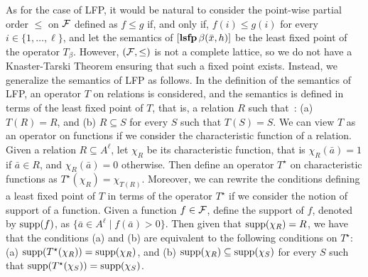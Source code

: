 As for the case of LFP, it would be natural to consider the point-wise partial order $\leq$ on $\mathcal{F}$ defined as $f \leq g$ if, and only if, $f(i) \leq g(i)$ for every $i \in \{1, \ldots, \ell\}$, and let the semantics of $[{\bf lsfp} \, \beta(\bar{x},h)]$ be the least fixed point of the operator $T_\beta$. However, $(\mathcal{F}, \leq)$ is not a complete lattice, so we do not have a Knaster-Tarski Theorem ensuring that such a fixed point exists. Instead, we generalize the semantics of LFP as follows. In the definition of the semantics of LFP, an operator $T$ on relations is considered, and the semantics is defined in terms of the least fixed point of $T$, that is, a relation $R$ such that~\cite{I86,vardi1982complexity}: 
(a) $T(R) = R$, and (b) $R \subseteq S$ for every $S$ such that $T(S) = S$.  
We can view $T$ as an operator on functions if we consider the characteristic function of a relation. Given a relation $R \subseteq A^\ell$, let $\chi_R$ be its characteristic function, that is $\chi_R(\bar a) = 1$ if $\bar a \in R$, and $\chi_R(\bar a) = 0$ otherwise. Then define an operator $T^\star$ on characteristic functions as $T^\star(\chi_R) = \chi_{T(R)}$. Moreover, we can rewrite the conditions defining a least fixed point of $T$ in terms of the operator $T^\star$ if we consider the notion of support of a function. Given a function $f \in \mathcal{F}$, define the support of $f$, denoted by $\text{\rm supp}(f)$, as $\{ \bar a \in A^\ell \mid f(\bar a) > 0 \}$. Then given that $\text{\rm supp}(\chi_R) = R$, we have that the conditions (a) and (b) are equivalent to the following conditions on $T^\star$:
(a) $\text{\rm supp}(T^\star(\chi_R)) = \text{\rm supp}(\chi_R)$, and  (b) $\text{\rm supp}(\chi_R) \subseteq \text{\rm supp}(\chi_S)$ for every $S$ such that  $\text{\rm supp}(T^\star(\chi_{S})) = \text{\rm supp}(\chi_S)$.

